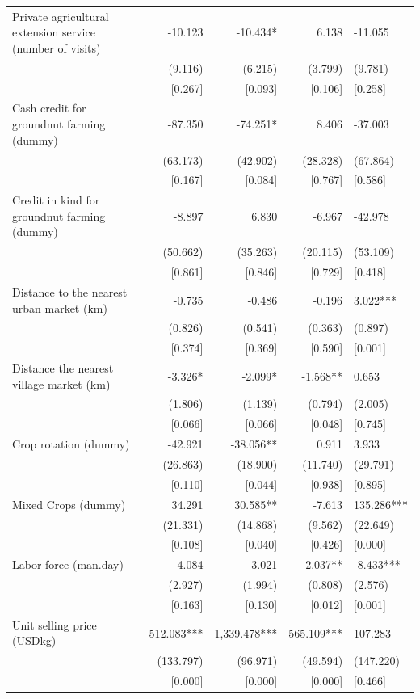 \documentclass[
]{article}
\begin{document}
\begin{ThreePartTable}
\begin{longtable}[t]{lrrrl}
Private agricultural extension service (number of visits) & -10.123 & -10.434* & 6.138 & -11.055\\
 & (9.116) & (6.215) & (3.799) & (9.781)\\
 & {}[0.267] & {}[0.093] & {}[0.106] & {}[0.258]\\
Cash credit for groundnut farming (dummy) & -87.350 & -74.251* & 8.406 & -37.003\\
 & (63.173) & (42.902) & (28.328) & (67.864)\\
 & {}[0.167] & {}[0.084] & {}[0.767] & {}[0.586]\\
Credit in kind for groundnut farming (dummy) & -8.897 & 6.830 & -6.967 & -42.978\\
 & (50.662) & (35.263) & (20.115) & (53.109)\\
 & {}[0.861] & {}[0.846] & {}[0.729] & {}[0.418]\\
Distance to the nearest urban market (km) & -0.735 & -0.486 & -0.196 & 3.022***\\
 & (0.826) & (0.541) & (0.363) & (0.897)\\
 & {}[0.374] & {}[0.369] & {}[0.590] & {}[0.001]\\
Distance the nearest village market (km) & -3.326* & -2.099* & -1.568** & 0.653\\
 & (1.806) & (1.139) & (0.794) & (2.005)\\
 & {}[0.066] & {}[0.066] & {}[0.048] & {}[0.745]\\
Crop rotation (dummy) & -42.921 & -38.056** & 0.911 & 3.933\\
 & (26.863) & (18.900) & (11.740) & (29.791)\\
 & {}[0.110] & {}[0.044] & {}[0.938] & {}[0.895]\\
Mixed Crops (dummy) & 34.291 & 30.585** & -7.613 & 135.286***\\
 & (21.331) & (14.868) & (9.562) & (22.649)\\
 & {}[0.108] & {}[0.040] & {}[0.426] & {}[0.000]\\
Labor force (man.day) & -4.084 & -3.021 & -2.037** & -8.433***\\
 & (2.927) & (1.994) & (0.808) & (2.576)\\
 & {}[0.163] & {}[0.130] & {}[0.012] & {}[0.001]\\
Unit selling price (USD\/kg) & 512.083*** & 1,339.478*** & 565.109*** & 107.283\\
 & (133.797) & (96.971) & (49.594) & (147.220)\\
 & {}[0.000] & {}[0.000] & {}[0.000] & {}[0.466]\\

\end{longtable}
\end{ThreePartTable}
\end{document}

